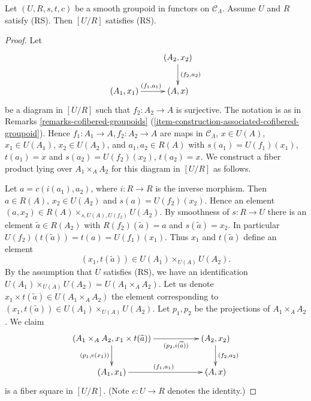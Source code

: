 \begin{lemma}
\label{lemma-smooth-RS-groupoid-in-functors-quotient}
Let $(U, R, s,t,c)$ be a smooth groupoid in functors on $\mathcal{C}_\Lambda$. 
Assume $U$ and $R$ satisfy (RS). Then $[U/R]$ satisfies (RS).
\end{lemma}

\begin{proof}
Let 
$$
\xymatrix{
                           &     (A_2,x_2) \ar[d]^{(f_2,a_2)} \\
(A_1,x_1) \ar[r]^{(f_1,a_1)} &     (A,x)
}
$$
be a diagram in $[U/R]$ such that $f_2: A_2 \to A$ is surjective. The 
notation is as in
Remarks \ref{remarks-cofibered-groupoids} 
(\ref{item-construction-associated-cofibered-groupoid}).
Hence $f_1: A_1 \to A, f_2: A_2 \to A$ are maps in
$\mathcal{C}_\Lambda$, $x \in U(A)$, $x_1 \in U(A_1)$, $x_2 \in U(A_2)$,
and $a_1, a_2 \in R(A)$ with $s(a_1) = U(f_1)(x_1)$,
$t(a_1) = x$ and $s(a_2) = U(f_2)(x_2)$, $t(a_2) = x$.
We construct a fiber product lying over $A_1 \times_A A_2$
for this diagram in $[U/R]$ as follows. 

\medskip \noindent 
Let $a = c(i(a_1),a_2)$, where $i: R \to R$ is the inverse morphism.
Then $a \in R(A)$, $x_2 \in U(A_2)$ and $s(a) = U(f_2)(x_2)$.
Hence an element $(a, x_2) \in R(A) \times_{s, U(A), U(f_2)} U(A_2)$.
By smoothness of $s : R \to U$ there is an element
$\widetilde{a} \in R(A_2)$ with $R(f_2)(\widetilde{a}) = a$ and
$s(\widetilde{a}) = x_2$. In particular
$U(f_2)(t(\widetilde{a})) = t(a) = U(f_1)(x_1)$. Thus $x_1$ and 
$t(\widetilde{a})$ define an element 
$$
(x_1, t(\widetilde{a})) \in U(A_1) \times_{U(A)} U(A_2).
$$
By the assumption that $U$ satisfies (RS), we have an identification
$U(A_1) \times_{U(A)} U(A_2) = U(A_1 \times_{A} A_2)$. Let us denote
$x_1 \times t(\widetilde{a}) \in U(A_1 \times_{A} A_2)$ the element
corresponding to $(x_1, t(\widetilde{a})) \in U(A_1) \times_{U(A)} U(A_2)$.
Let $p_1,p_2$ be the projections of $A_1 \times_{A} A_2$.  We claim 
$$
\xymatrix{
(A_1 \times_A A_2, x_1 \times t(\widetilde{a})) \ar[d]_{(p_1, e(x_1))} 
\ar[rr]_-{(p_2, i(\widetilde{a}))} & & (A_2, x_2) \ar[d]^{(f_2,a_2)} \\
(A_1, x_1) \ar[rr]^{(f_1,a_1)} && (A,x) 
}
$$
is a fiber square in $[U/R]$. (Note $e: U \to R$ denotes the identity.)


\end{proof}
